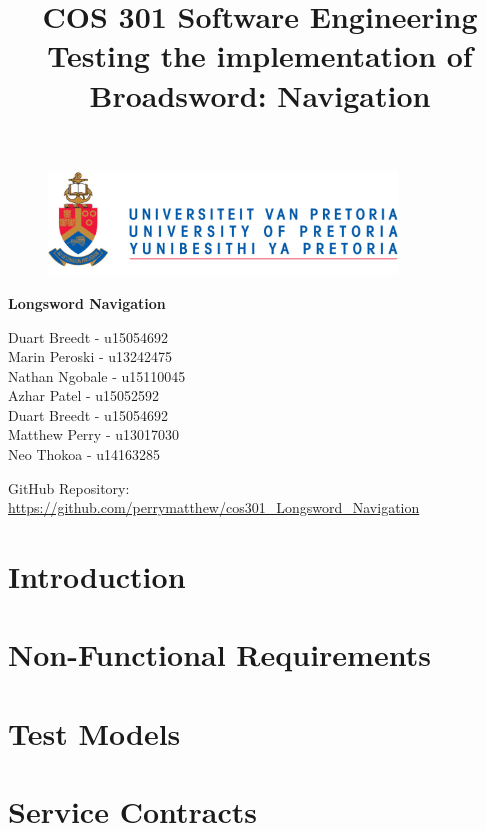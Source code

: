 \documentclass{article}
\begin{document}
		\begin{figure}[t]
			\centering
			\includegraphics[width=350px]{UP_Logo.PNG}
		\end{figure}
			\title{COS 301 Software Engineering\\ Testing the implementation of Broadsword: Navigation}
\maketitle
		\begin{center}
			\textbf{\newline Longsword Navigation} \\
		\end{center}
			
				
		\begin{flushright} \large
			Duart Breedt - u15054692\\			
			Marin Peroski - u13242475\\
			Nathan Ngobale -  u15110045\\
			Azhar Patel - u15052592\\
			Duart Breedt - u15054692\\
			Matthew Perry - u13017030\\
			Neo Thokoa - u14163285\\
		\end{flushright}
		
		
		
		
		GitHub Repository: \href{https://github.com/perrymatthew/cos301_Longsword_Navigation}\\
		\url{https://github.com/perrymatthew/cos301_Longsword_Navigation}
	

\clearpage
\tableofcontents
\clearpage

\section{Introduction}

\clearpage

\section{Non-Functional Requirements}
	
\clearpage
	
\section{Test Models}
	
\clearpage

\section{Service Contracts}
	
\end{document}
